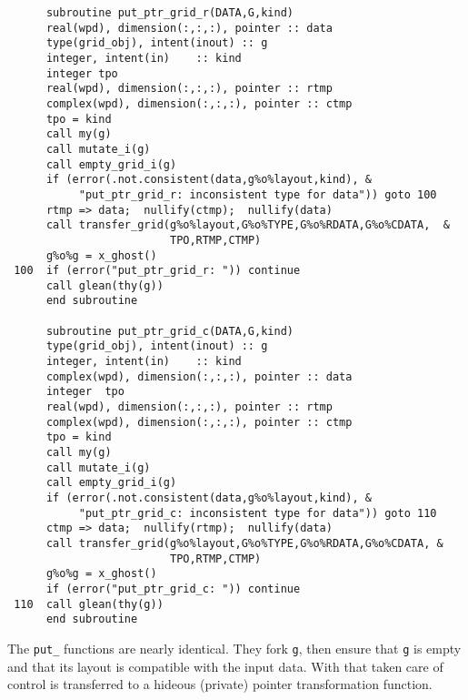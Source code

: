 \begin{verbatim}
      subroutine put_ptr_grid_r(DATA,G,kind)
      real(wpd), dimension(:,:,:), pointer :: data
      type(grid_obj), intent(inout) :: g
      integer, intent(in)    :: kind
      integer tpo
      real(wpd), dimension(:,:,:), pointer :: rtmp
      complex(wpd), dimension(:,:,:), pointer :: ctmp
      tpo = kind
      call my(g)
      call mutate_i(g)
      call empty_grid_i(g)
      if (error(.not.consistent(data,g%o%layout,kind), &
           "put_ptr_grid_r: inconsistent type for data")) goto 100
      rtmp => data;  nullify(ctmp);  nullify(data)
      call transfer_grid(g%o%layout,G%o%TYPE,G%o%RDATA,G%o%CDATA,  &
                         TPO,RTMP,CTMP)
      g%o%g = x_ghost()
 100  if (error("put_ptr_grid_r: ")) continue
      call glean(thy(g))
      end subroutine

      subroutine put_ptr_grid_c(DATA,G,kind)
      type(grid_obj), intent(inout) :: g
      integer, intent(in)    :: kind
      complex(wpd), dimension(:,:,:), pointer :: data
      integer  tpo
      real(wpd), dimension(:,:,:), pointer :: rtmp
      complex(wpd), dimension(:,:,:), pointer :: ctmp
      tpo = kind
      call my(g)
      call mutate_i(g)
      call empty_grid_i(g)
      if (error(.not.consistent(data,g%o%layout,kind), &
           "put_ptr_grid_c: inconsistent type for data")) goto 110
      ctmp => data;  nullify(rtmp);  nullify(data)
      call transfer_grid(g%o%layout,G%o%TYPE,G%o%RDATA,G%o%CDATA, &
                         TPO,RTMP,CTMP)
      g%o%g = x_ghost()
      if (error("put_ptr_grid_c: ")) continue
 110  call glean(thy(g))
      end subroutine
\end{verbatim}
The \verb+put_+ functions are nearly identical.  They fork \verb+g+,
then ensure that \verb+g+ is empty and that its layout is compatible with
the input data.  With that taken care of control is transferred to a 
hideous (private) pointer transformation function.

